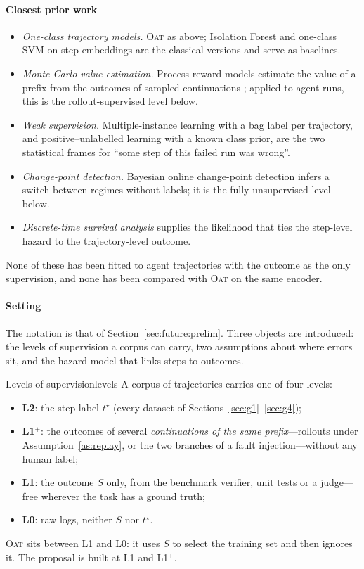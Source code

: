 \paragraph{Closest prior work}
\begin{itemize}[leftmargin=1.1em]
\item \emph{One-class trajectory models.} \textsc{Oat} \cite{yeh2026oat} as above; Isolation Forest and one-class SVM on step embeddings are the classical versions and serve as baselines.
\item \emph{Monte-Carlo value estimation.} Process-reward models estimate the value of a prefix from the outcomes of sampled continuations \cite{wang2024mathshepherd}; applied to agent runs, this is the rollout-supervised level below.
\item \emph{Weak supervision.} Multiple-instance learning \cite{dietterich1997mil} with a bag label per trajectory, and positive--unlabelled learning \cite{elkan2008pu,kiryo2017nnpu} with a known class prior, are the two statistical frames for ``some step of this failed run was wrong''.
\item \emph{Change-point detection.} Bayesian online change-point detection \cite{adams2007bocpd} infers a switch between regimes without labels; it is the fully unsupervised level below.
\item \emph{Discrete-time survival analysis} supplies the likelihood that ties the step-level hazard to the trajectory-level outcome.
\end{itemize}
None of these has been fitted to agent trajectories with the outcome as the only supervision, and none has been compared with \textsc{Oat} on the same encoder.

\paragraph{Setting} The notation is that of Section~\ref{sec:future:prelim}. Three objects are introduced: the levels of supervision a corpus can carry, two assumptions about where errors sit, and the hazard model that links steps to outcomes.

\begin{definition}{Levels of supervision}{levels}
A corpus of trajectories carries one of four levels:
\begin{itemize}[leftmargin=1.1em]
\item \textbf{L2}: the step label $t^\star$ (every dataset of Sections~\ref{sec:g1}--\ref{sec:g4});
\item \textbf{L1$^{+}$}: the outcomes of several \emph{continuations of the same prefix}---rollouts under Assumption~\ref{as:replay}, or the two branches of a fault injection---without any human label;
\item \textbf{L1}: the outcome $S$ only, from the benchmark verifier, unit tests or a judge---free wherever the task has a ground truth;
\item \textbf{L0}: raw logs, neither $S$ nor $t^\star$.
\end{itemize}
\textsc{Oat} sits between L1 and L0: it uses $S$ to select the training set and then ignores it. The proposal is built at L1 and L1$^{+}$.
\end{definition}

